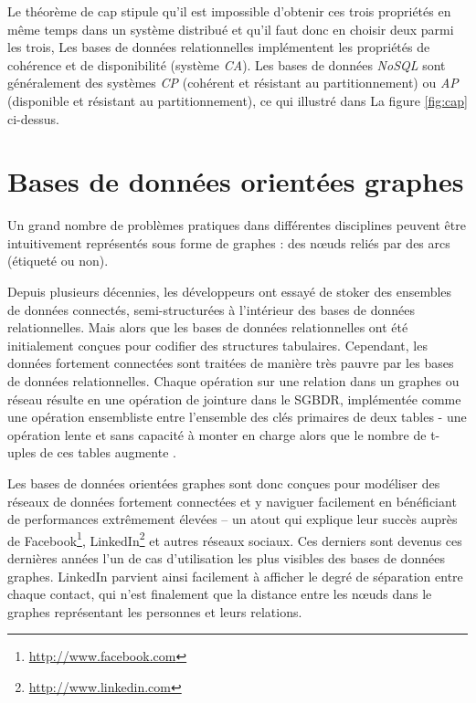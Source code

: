   

  Le théorème de \acrshort{cap} stipule qu'il est impossible d'obtenir
  ces trois propriétés en même temps dans un système distribué et
  qu'il faut donc en choisir deux parmi les trois, Les bases de
  données relationnelles implémentent les propriétés de cohérence et
  de disponibilité (système \emph{CA}). Les bases de données
  \emph{NoSQL} sont généralement des systèmes \emph{CP} (cohérent et
  résistant au partitionnement) ou \emph{AP} (disponible et résistant
  au partitionnement), ce qui illustré dans La figure \ref{fig:cap}
  ci-dessus.



\section{Bases de données orientées graphes}
\label{sec:graph-database-overview}
\begin{text}
  Un grand nombre de problèmes pratiques dans différentes disciplines
  peuvent être intuitivement représentés sous forme de graphes : des
  nœuds reliés par des arcs (étiqueté ou non).

  Depuis plusieurs décennies, les développeurs ont essayé de stoker
  des ensembles de données connectés, semi-structurées à l'intérieur
  des bases de données relationnelles. Mais alors que les bases de
  données relationnelles ont été initialement conçues pour codifier
  des structures tabulaires. Cependant, les données fortement
  connectées sont traitées de manière très pauvre par les bases de
  données relationnelles. Chaque opération sur une relation dans un
  graphes ou réseau résulte en une opération de jointure dans le
  \acrshort{SGBDR}, implémentée comme une opération ensembliste entre
  l'ensemble des clés primaires de deux tables - une opération lente
  et sans capacité à monter en charge alors que le nombre de t-uples
  de ces tables augmente \cite{robinson2013graph}.

  Les bases de données orientées graphes sont donc conçues pour
  modéliser des réseaux de données fortement connectées et y naviguer
  facilement en bénéficiant de performances extrêmement élevées – un
  atout qui explique leur succès auprès de
  Facebook\footnote{\url{http://www.facebook.com}},
  LinkedIn\footnote{\url{http://www.linkedin.com}} et autres réseaux
  sociaux. Ces derniers sont devenus ces dernières années l'un de cas
  d'utilisation les plus visibles des bases de données graphes.
  LinkedIn parvient ainsi facilement à afficher le degré de séparation
  entre chaque contact, qui n'est finalement que la distance entre les
  nœuds dans le graphes représentant les personnes et leurs relations.
\end{text}

